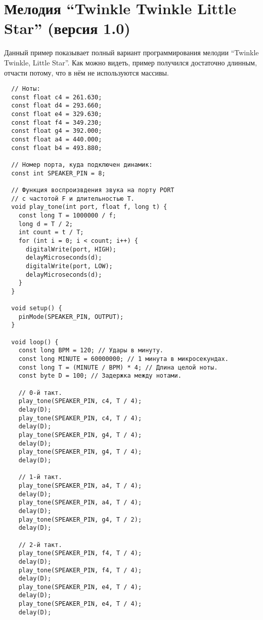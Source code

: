 \documentclass[../sparc.tex]{subfiles}
\begin{document}
\newpage
\chapter{Мелодия ``Twinkle Twinkle Little Star'' (версия 1.0)}
\label{app:twinkle-twinkle-little-star-01}

Данный пример показывает полный вариант программирования мелодии ``Twinkle
Twinkle, Little Star''. Как можно видеть, пример получился достаточно длинным,
отчасти потому, что в нём не используются массивы.

\begin{verbatim}
  // Ноты:
  const float c4 = 261.630;
  const float d4 = 293.660;
  const float e4 = 329.630;
  const float f4 = 349.230;
  const float g4 = 392.000;
  const float a4 = 440.000;
  const float b4 = 493.880;

  // Номер порта, куда подключен динамик:
  const int SPEAKER_PIN = 8;

  // Функция воспроизвдения звука на порту PORT
  // с частотой F и длительностью T.
  void play_tone(int port, float f, long t) {
    const long T = 1000000 / f;
    long d = T / 2;
    int count = t / T;
    for (int i = 0; i < count; i++) {
      digitalWrite(port, HIGH);
      delayMicroseconds(d);
      digitalWrite(port, LOW);
      delayMicroseconds(d);
    }
  }

  void setup() {
    pinMode(SPEAKER_PIN, OUTPUT);
  }

  void loop() {
    const long BPM = 120; // Удары в минуту.
    const long MINUTE = 60000000; // 1 минута в микросекундах.
    const long T = (MINUTE / BPM) * 4; // Длина целой ноты.
    const byte D = 100; // Задержка между нотами.

    // 0-й такт.
    play_tone(SPEAKER_PIN, c4, T / 4);
    delay(D);
    play_tone(SPEAKER_PIN, c4, T / 4);
    delay(D);
    play_tone(SPEAKER_PIN, g4, T / 4);
    delay(D);
    play_tone(SPEAKER_PIN, g4, T / 4);
    delay(D);

    // 1-й такт.
    play_tone(SPEAKER_PIN, a4, T / 4);
    delay(D);
    play_tone(SPEAKER_PIN, a4, T / 4);
    delay(D);
    play_tone(SPEAKER_PIN, g4, T / 2);
    delay(D);

    // 2-й такт.
    play_tone(SPEAKER_PIN, f4, T / 4);
    delay(D);
    play_tone(SPEAKER_PIN, f4, T / 4);
    delay(D);
    play_tone(SPEAKER_PIN, e4, T / 4);
    delay(D);
    play_tone(SPEAKER_PIN, e4, T / 4);
    delay(D);


\end{verbatim}
\end{document}
